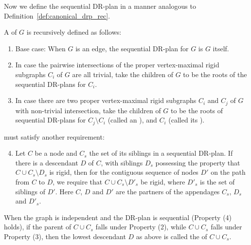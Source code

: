 Now we define the sequential DR-plan in a manner analogous to Definition~\ref{def:canonical_drp_rec}.

\begin{definition}
\label{def:seqdrp}
    A  of $G$ is recursively defined as follows:
    \begin{enumerate}
        \item Base case: When $G$ is an edge, the sequential DR-plan for $G$ is $G$ itself.
        \item In case the pairwise intersections of the proper vertex-maximal rigid subgraphs $C_i$ of $G$  are all trivial, take the children of $G$ to be the roots of the sequential DR-plans for $C_i$.
        \item In case there are two proper vertex-maximal rigid subgraphs $C_i$ and $C_j$ of $G$ with non-trivial intersection, take the children of $G$ to be the roots of sequential DR-plans for $C_j\setminus C_i$ (called an ), and $C_i$ (called its ).
    \end{enumerate}


     must satisfy another requirement:

    \begin{enumerate}
        \setcounter{enumi}{3}
        \item Let $C$ be a node and $C_s$ the set of its siblings in a sequential DR-plan. If there is a descendant $D$ of $C$, with siblings $D_s$  possessing the property that $C\cup C_s\setminus D_s$ is rigid, then for the contiguous sequence of nodes $D'$ on the path from $C$ to $D$, we require that $C\cup C_s \setminus D'_s$ be rigid, where $D'_s$ is the set of siblings of $D'$. Here $C$, $D$ and $D'$ are the partners of the appendages $C_s$, $D_s$ and $D'_s$.
    \end{enumerate}

    When the graph is independent and the DR-plan is sequential (Property (4) holds), if the parent of $C\cup C_s$ falls under Property (2), while $C\cup C_s$ falls under Property (3), then the lowest descendant $D$ as above is called the  of $C\cup C_s$.
\end{definition}

